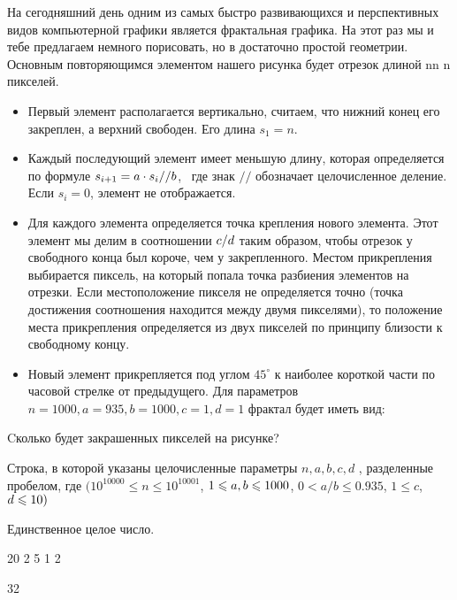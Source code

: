 
На сегодняшний день одним из самых быстро развивающихся и перспективных видов компьютерной графики является фрактальная графика. 
На этот раз мы и тебе предлагаем немного порисовать, но в достаточно простой геометрии. Основным повторяющимся элементом нашего 
рисунка будет отрезок длиной nn n  пикселей. 
\begin{itemize}
    \item Первый элемент располагается вертикально, считаем, что нижний конец его закреплен, 
    а верхний свободен. Его длина $s_1 = n$. 
    \item Каждый последующий элемент имеет меньшую длину, которая определяется по формуле 
    $s_{i+1}=a \cdot s_i \space // \space b$,  где знак $//$ обозначает целочисленное деление. Если $s_i = 0$, элемент не отображается.
    \item Для каждого элемента определяется точка крепления нового элемента. Этот элемент мы 
    делим в соотношении $c \space / \space d$ таким образом, чтобы отрезок у свободного конца был короче, чем у закрепленного. 
    Местом прикрепления выбирается пиксель, на который попала точка разбиения элементов на отрезки. Если 
    местоположение пикселя не определяется точно (точка достижения соотношения находится между двумя пикселями), 
    то положение места прикрепления определяется из двух пикселей по принципу близости к свободному концу.
    \item Новый элемент прикрепляется под углом $45^{\circ}$ к наиболее короткой части по часовой стрелке от 
    предыдущего. Для параметров $n = 1000, a = 935, b = 1000, c = 1, d = 1$  фрактал будет иметь вид:
\end{itemize}


Cколько будет закрашенных пикселей на рисунке?

Строка, в которой указаны целочисленные параметры $n, a, b, c, d$ , разделенные пробелом, где 
$(10^{10000} \leq n \leq 10^{10001}$, $1 \leq a,\space b \leq 1000$, $0 < a/b \leq  0.935$, 
$1 \leq c$, $\space d \leq 10 )$

\outputfmtSection
Единственное целое число.


\begin{myverbbox}[\small]{\vinput}
    20 2 5 1 2
\end{myverbbox}

\begin{myverbbox}[\small]{\voutput}
    32
\end{myverbbox}

